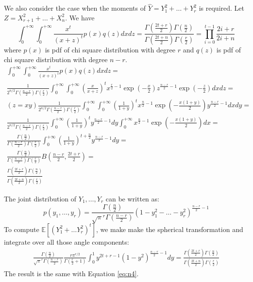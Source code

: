 \documentclass{article}
\def\E{\mathbb{E}}
\begin{document}
We also consider the case when the moments of
$\hat{Y} = Y_1^2 + \dots + Y_r^2$ is required.
Let $Z = X_{r+1}^2 + \dots + X_n^2$. We have
\begin{equation}\label{eq:n4}
\int_{0}^{+\infty}\int_{0}^{+\infty} \frac{x^t}{(x+z)^t} p(x)q(z) dxdz =
\frac{\Gamma(\frac{2t+r}{2})\Gamma(\frac{n}{2})}
{\Gamma(\frac{2t+n}{2})\Gamma(\frac{r}{2})} =
\prod_{i=0}^{t-1} \frac{2i+r}{2i+n}
\end{equation}
where $p(x)$ is pdf of chi square distribution with degree $r$ and $q(z)$
is pdf of chi square distribution with degree $n-r$.
\begin{align*}
\int_{0}^{+\infty}\int_{0}^{+\infty} \frac{x^t}{(x+z)^t} p(x)q(z) dxdz =
& \\ \frac{1}{2^{n/2} \Gamma(\frac{n-r}{2})\Gamma(\frac{r}{2})}
\int_{0}^{+\infty}\int_{0}^{+\infty}
\left(\frac{x}{x+z}\right)^t
x^{\frac{r}{2}-1}\exp(-\frac{x}{2})
z^{\frac{n-r}{2}-1}\exp(-\frac{z}{2})dxdz =
& \\ (z=xy) \frac{1}{2^{n/2}\Gamma(\frac{n-r}{2})\Gamma(\frac{r}{2})}
\int_{0}^{+\infty}\int_{0}^{+\infty}
\left(\frac{1}{1+y}\right)^t
x^{\frac{n}{2}-1}\exp(-\frac{x(1+y)}{2})y^{\frac{n-r}{2}-1}dxdy =
& \\  \frac{1}{2^{n/2} \Gamma(\frac{n-r}{2})\Gamma(\frac{r}{2})}
\int_{0}^{+\infty}\left(\frac{1}{1+y}\right)^t
y^{\frac{n-r}{2}-1} dy
\int_{0}^{+\infty} x^{\frac{n}{2}-1}\exp(-\frac{x(1+y)}{2})dx = & \\
\frac{\Gamma(\frac{n}{2})}{\Gamma(\frac{n-r}{2})\Gamma(\frac{r}{2})}
\int_{0}^{+\infty}\left(\frac{1}{1+y}\right)^{t+\frac{n}{2}}
y^{\frac{n-r}{2}-1} dy =
& \\  \frac{\Gamma(\frac{n}{2})}{\Gamma(\frac{n-r}{2})\Gamma(\frac{r}{2})}
B(\frac{n-r}{2}, \frac{2t+r}{2}) =
& \\ \frac{\Gamma(\frac{2t+r}{2})\Gamma(\frac{n}{2})}
{\Gamma(\frac{2t+n}{2})\Gamma(\frac{r}{2})}
\end{align*}

The joint distribution of $Y_1, \dots, Y_r$ can be written as:
$$
p(y_1, \dots, y_r) = \frac{\Gamma(\frac{n}{2})}{\sqrt{\pi}^r \Gamma(\frac{n-r}{2})}(1- y_1^2 - \dots - y_r^2)^{\frac{n-r}{2} -1}
$$
To compute $\E[(Y_1^2 + \dots Y_r^2)^t]$, we make
make the spherical transformation and integrate over all those angle components:
\begin{align*}
\frac{\Gamma(\frac{n}{2})}{\sqrt{\pi}^r\Gamma(\frac{n-r}{2})}  \frac{r\pi^{r/2}}{\Gamma(\frac{r}{2}+1)}\int_{0}^1 y^{2t+r-1}(1- y^2)^{\frac{n-r}{2} -1} dy =
\frac{\Gamma(\frac{2t+r}{2})\Gamma(\frac{n}{2})}
{\Gamma(\frac{2t+n}{2})\Gamma(\frac{r}{2})}
\end{align*}
The result is the same with Equation \eqref{eq:n4}.
\end{document}
